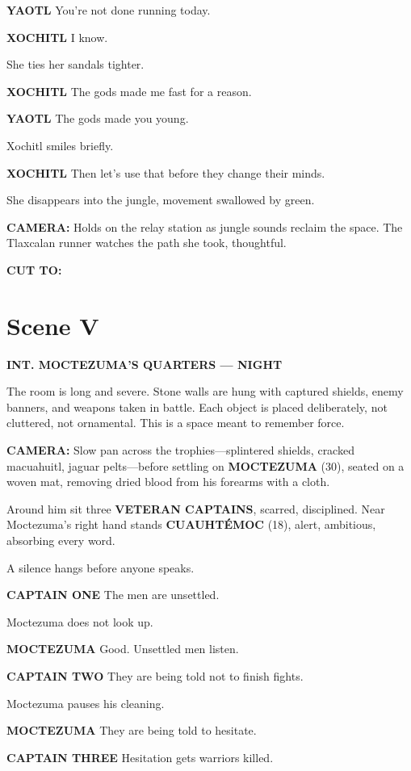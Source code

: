 \documentclass[12pt]{article}
\begin{document}
\textbf{YAOTL}  
You’re not done running today.

\textbf{XOCHITL}  
I know.

She ties her sandals tighter.

\textbf{XOCHITL}  
The gods made me fast for a reason.

\textbf{YAOTL}  
The gods made you young.

Xochitl smiles briefly.

\textbf{XOCHITL}  
Then let’s use that before they change their minds.

She disappears into the jungle, movement swallowed by green.

\textbf{CAMERA:} Holds on the relay station as jungle sounds reclaim the space. The Tlaxcalan runner watches the path she took, thoughtful.

\textbf{CUT TO:}

\section*{Scene V}

\textbf{INT. MOCTEZUMA’S QUARTERS — NIGHT}

The room is long and severe. Stone walls are hung with captured shields, enemy banners, and weapons taken in battle. Each object is placed deliberately, not cluttered, not ornamental. This is a space meant to remember force.

\textbf{CAMERA:} Slow pan across the trophies—splintered shields, cracked macuahuitl, jaguar pelts—before settling on \textbf{MOCTEZUMA} (30), seated on a woven mat, removing dried blood from his forearms with a cloth.

Around him sit three \textbf{VETERAN CAPTAINS}, scarred, disciplined. Near Moctezuma’s right hand stands \textbf{CUAUHTÉMOC} (18), alert, ambitious, absorbing every word.

A silence hangs before anyone speaks.

\textbf{CAPTAIN ONE}  
The men are unsettled.

Moctezuma does not look up.

\textbf{MOCTEZUMA}  
Good.  
Unsettled men listen.

\textbf{CAPTAIN TWO}  
They are being told not to finish fights.

Moctezuma pauses his cleaning.

\textbf{MOCTEZUMA}  
They are being told to hesitate.

\textbf{CAPTAIN THREE}  
Hesitation gets warriors killed.
\end{document}
